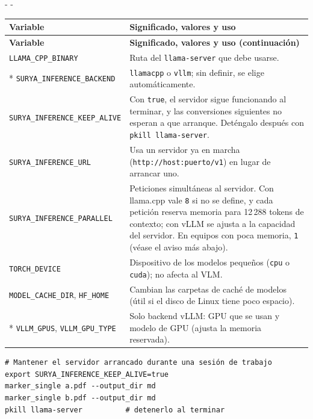 \documentclass[11pt,a4paper]{article}
\makeatletter
\newcommand{\necesitaespacio}[1]{\par\penalty-100\begingroup
	\setlength{\dimen@}{#1}\dimen@ii\pagegoal\advance\dimen@ii-\pagetotal
	\ifdim\dimen@>\dimen@ii\ifdim\dimen@ii>\z@\vfil\fi\penalty-\@M\fi\endgroup}
\newenvironment{opciones}[1][Opción]{%
	\par\begingroup\small
	\begin{longtable}{L{4.25cm}L{11.2cm}}
		\toprule\rowcolor{tablacab}\cab{#1} & \cab{Significado, valores y uso} \\ \midrule
		\endfirsthead
		\toprule\rowcolor{tablacab}\cab{#1} & \cab{Significado, valores y uso (continuación)} \\ \midrule
		\endhead
		\bottomrule
		\endfoot}
	{\end{longtable}\endgroup}
\newcommand{\cmd}[1]{\texttt{\textcolor{colcmd}{#1}}}      %
\newcommand{\val}[1]{\texttt{#1}}                          %
\newcommand{\cab}[1]{\textbf{#1}}
\makeatother
\begin{document}
	\necesitaespacio{25\baselineskip}
	\begin{opciones}[Variable]
		\texttt{LLAMA\_\allowbreak{}CPP\_\allowbreak{}BINARY} & Ruta del \cmd{llama-server} que debe usarse.\\*
		\texttt{SURYA\_\allowbreak{}INFERENCE\_\allowbreak{}BACKEND} & \val{llamacpp} o \val{vllm}; sin definir, se elige automáticamente.\\
		\texttt{SURYA\_\allowbreak{}INFERENCE\_\allowbreak{}KEEP\_\allowbreak{}ALIVE} & Con \val{true}, el servidor sigue funcionando al terminar, y las conversiones siguientes no esperan a que arranque. Deténgalo después con \cmd{pkill llama-\allowbreak{}server}.\\
		\texttt{SURYA\_\allowbreak{}INFERENCE\_\allowbreak{}URL} & Usa un servidor ya en marcha (\val{http:/\allowbreak{}/\allowbreak{}host:puerto/\allowbreak{}v1}) en lugar de arrancar uno.\\
		\texttt{SURYA\_\allowbreak{}INFERENCE\_\allowbreak{}PARALLEL} & Peticiones simultáneas al servidor. Con llama.cpp vale \val{8} si no se define, y cada petición reserva memoria para 12\,288 tokens de contexto; con vLLM se ajusta a la capacidad del servidor. En equipos con poca memoria, \val{1} (véase el aviso más abajo).\\
		\texttt{TORCH\_DEVICE} & Dispositivo de los modelos pequeños (\val{cpu} o \val{cuda}); no afecta al VLM.\\
		\texttt{MODEL\_\allowbreak{}CACHE\_\allowbreak{}DIR}, \texttt{HF\_HOME} & Cambian las carpetas de caché de modelos (útil si el disco de Linux tiene poco espacio).\\*
		\texttt{VLLM\_GPUS}, \texttt{VLLM\_\allowbreak{}GPU\_\allowbreak{}TYPE} & Solo backend vLLM: GPU que se usan y modelo de GPU (ajusta la memoria reservada).\\
	\end{opciones}
	
	\begin{lstlisting}
# Mantener el servidor arrancado durante una sesión de trabajo
export SURYA_INFERENCE_KEEP_ALIVE=true
marker_single a.pdf --output_dir md
marker_single b.pdf --output_dir md
pkill llama-server          # detenerlo al terminar
\end{lstlisting}
\end{document}
